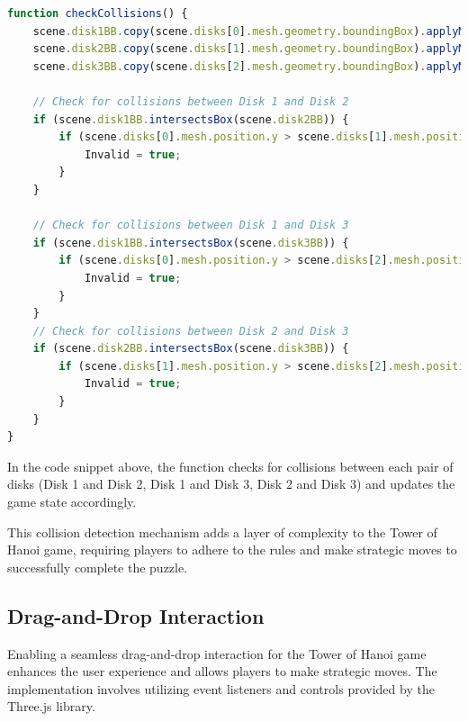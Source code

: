 \documentclass{article}
\begin{document}
\begin{lstlisting}[language=JavaScript, caption={Collision Detection Function}]
function checkCollisions() {
    scene.disk1BB.copy(scene.disks[0].mesh.geometry.boundingBox).applyMatrix4(scene.disks[0].mesh.matrixWorld);
    scene.disk2BB.copy(scene.disks[1].mesh.geometry.boundingBox).applyMatrix4(scene.disks[1].mesh.matrixWorld);
    scene.disk3BB.copy(scene.disks[2].mesh.geometry.boundingBox).applyMatrix4(scene.disks[2].mesh.matrixWorld);

    // Check for collisions between Disk 1 and Disk 2
    if (scene.disk1BB.intersectsBox(scene.disk2BB)) {
        if (scene.disks[0].mesh.position.y > scene.disks[1].mesh.position.y) {
            Invalid = true;
        }
    }

    // Check for collisions between Disk 1 and Disk 3
    if (scene.disk1BB.intersectsBox(scene.disk3BB)) {
        if (scene.disks[0].mesh.position.y > scene.disks[2].mesh.position.y) {
            Invalid = true;
        }
    }
    // Check for collisions between Disk 2 and Disk 3
    if (scene.disk2BB.intersectsBox(scene.disk3BB)) {
        if (scene.disks[1].mesh.position.y > scene.disks[2].mesh.position.y) {
            Invalid = true;
        }
    }
}
\end{lstlisting}

In the code snippet above, the function checks for collisions between each pair of disks (Disk 1 and Disk 2, Disk 1 and Disk 3, Disk 2 and Disk 3) and updates the game state accordingly.

This collision detection mechanism adds a layer of complexity to the Tower of Hanoi game, requiring players to adhere to the rules and make strategic moves to successfully complete the puzzle.


\subsection{Drag-and-Drop Interaction}

Enabling a seamless drag-and-drop interaction for the Tower of Hanoi game enhances the user experience and allows players to make strategic moves. The implementation involves utilizing event listeners and controls provided by the Three.js library.
\end{document}
